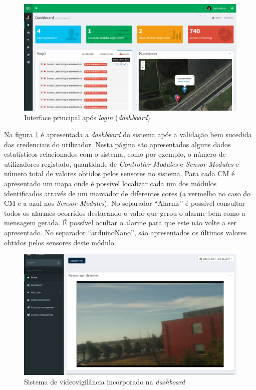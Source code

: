 \newpage

\begin{figure}[h]
	\centering
	\includegraphics[width=\linewidth]{prints-web/dashboard1.png}
	\caption{Interface principal após \textit{login} (\textit{dashboard})}
	\label{ddashboard}
\end{figure}




Na figura \ref{ddashboard} é apresentada a \textit{dashboard} do sistema após a validação bem sucedida das credenciais do utilizador. Nesta página são apresentados alguns dados estatísticos relacionados com o sistema, como por exemplo, o número de utilizadores registado, quantidade de \textit{Controller Modules} e \textit{Sensor Modules} e número total de valores obtidos pelos sensores no sistema. Para cada \acl{CM} é apresentado um mapa onde é possível localizar cada um dos módulos identificados através de um marcador de diferentes cores (a vermelho no caso do \acl{CM} e a azul nos \textit{Sensor Modules}). No separador ``Alarms''  é possível consultar todos os alarmes ocorridos destacando o valor que gerou o alarme bem como a mensagem gerada. É possível ocultar o alarme para que este não volte a ser apresentado. No separador ``arduinoNano'', são apresentados os últimos valores obtidos pelos sensores deste módulo. 


\begin{figure}[h]
	\centering
	\includegraphics[width=0.7\linewidth]{prints-web/stream.png}
	\caption{Sistema de videovigilância incorporado na \textit{dashboard}}
	\label{vigilancia}
\end{figure}







